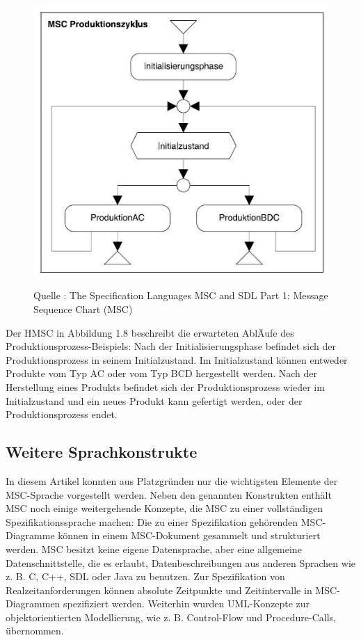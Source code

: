 \begin{center}
\begin{figure}[h]
   

\includegraphics[scale=1]{Graphics/HMSC.jpg}



Quelle : The Specification Languages MSC and SDL
Part 1: Message Sequence Chart (MSC) 

 
\label{fig9}


\end{figure}

\end{center}
\newpage
Der HMSC in Abbildung 1.8 beschreibt die erwarteten AblÄufe
des Produktionsprozess-Beispiels: Nach der Initialisierungsphase
befindet sich der Produktionsprozess in seinem
Initialzustand. Im Initialzustand können entweder Produkte
vom Typ AC oder vom Typ BCD hergestellt werden. Nach
der Herstellung eines Produkts befindet sich der Produktionsprozess
wieder im Initialzustand und ein neues Produkt
kann gefertigt werden, oder der Produktionsprozess endet.

\subsection{Weitere Sprachkonstrukte}
In diesem Artikel konnten aus Platzgründen nur die
wichtigsten Elemente der MSC-Sprache vorgestellt werden.
Neben den genannten Konstrukten enthält MSC
noch einige weitergehende Konzepte, die MSC zu einer
vollständigen Spezifikationssprache machen: Die zu einer
Spezifikation gehörenden MSC-Diagramme können in
einem MSC-Dokument gesammelt und strukturiert werden.
MSC besitzt keine eigene Datensprache, aber eine
allgemeine Datenschnittstelle, die es erlaubt, Datenbeschreibungen
aus anderen Sprachen wie z. B. C, C++, SDL
oder Java zu benutzen. Zur Spezifikation von Realzeitanforderungen
können absolute Zeitpunkte und Zeitintervalle
in MSC-Diagrammen spezifiziert werden. Weiterhin wurden
UML-Konzepte zur objektorientierten Modellierung,
wie z. B. Control-Flow und Procedure-Calls, übernommen.





